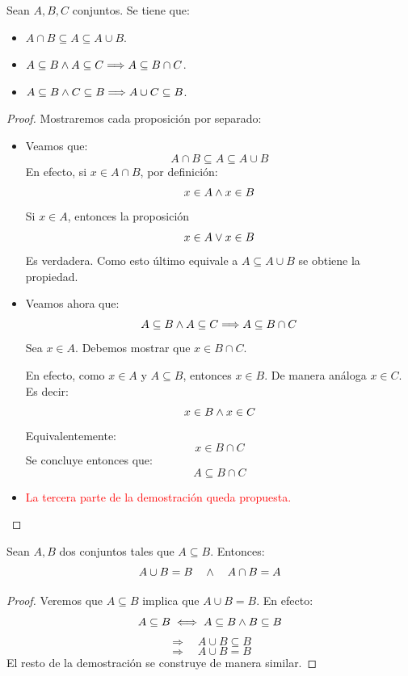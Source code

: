 \begin{proposicion}
	Sean $A, B, C$ conjuntos. Se tiene que: 
	\begin{itemize}
		\item $A \cap B \subseteq A \subseteq A \cup B$. 
		\item $A \subseteq B \wedge A \subseteq C \Longrightarrow A \subseteq B \cap C$. 
		\item $A \subseteq B \wedge C \subseteq B \Longrightarrow A \cup C \subseteq B$. 
	\end{itemize}
\end{proposicion}

\begin{proof}
	Mostraremos cada proposición por separado: 
	\begin{itemize}
		\item Veamos que: $$ A \cap B \subseteq A \subseteq A \cup B$$ 
		En efecto, si $x \in A \cap B$, por definición:
		$$ x \in A \wedge x \in B $$ 
		Si $x\in A$, entonces la proposición 
		$$ x \in A \vee x \in B$$
		Es verdadera. Como esto último equivale a $A \subseteq A \cup B$ se obtiene la propiedad.
		
		\item Veamos ahora que: 
		$$A \subseteq B \wedge A \subseteq C \Longrightarrow A \subseteq B \cap C$$
		Sea $x \in A$. Debemos mostrar que $x \in B\cap C$. 
		
		En efecto, como $x \in A$ y $A \subseteq B$, entonces $x \in B$. De manera análoga $x \in C$. Es decir: 
		$$ x \in B \wedge x\in C$$ 
		Equivalentemente: 
		$$ x \in B \cap C $$
		Se concluye entonces que: 
		$$ A \subseteq B \cap C $$ 
		
		\item \textcolor{red}{La tercera parte de la demostración queda propuesta.}
	\end{itemize}
\end{proof}


\begin{proposicion}
	Sean $A, B$ dos conjuntos tales que $A \subseteq B$. Entonces: 
	$$ A \cup B = B \quad \wedge \quad A \cap B = A $$ 
\end{proposicion}

\begin{proof}
	Veremos que $A \subseteq B$ implica que $ A \cup B = B$. 
	En efecto:
	$$ A \subseteq B \iff A \subseteq B \wedge B \subseteq B $$ 
	$$ \Longrightarrow \quad A \cup B \subseteq B $$ 
	$$ \Longrightarrow \quad A \cup B = B $$ 
	El resto de la demostración se construye de manera similar. 
\end{proof}

